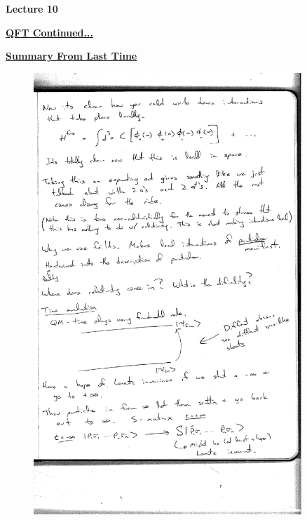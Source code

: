 



\thispagestyle{fancy}

\begin{center}
{\huge \textbf{Lecture 10}}
\end{center}

{\fontsize{14}{16}\selectfont

\textbf{\underline{QFT Continued...}} 

{\Large \underline{\textbf{Summary From Last Time}}}


\begin{figure}[h]
\centering
\includegraphics[width=0.9\textwidth]{./TimeEvolution.pdf}
\end{figure}

}
